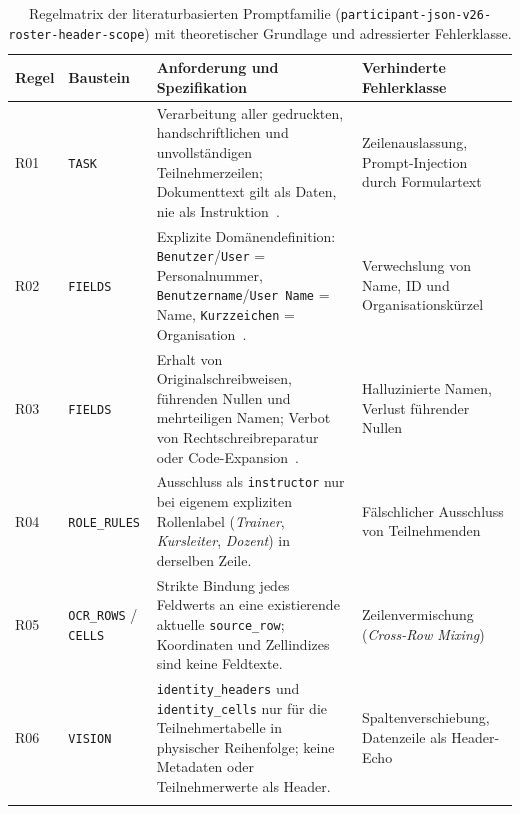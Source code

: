 \begin{table}[htbp]
  \centering
  \caption[Regelmatrix der literaturbasierten Promptfamilie]{Regelmatrix der literaturbasierten Promptfamilie (\texttt{participant-json-v26-roster-header-scope}) mit theoretischer Grundlage und adressierter Fehlerklasse.}
  \label{tab:prompt-regelmatrix}
  \footnotesize
  \begin{tabularx}{\textwidth}{@{}>{\raggedright\arraybackslash}p{} >{\raggedright\arraybackslash}p{} >{\raggedright\arraybackslash}X >{\raggedright\arraybackslash}p{}@{}}
    \toprule
    \textbf{Regel} & \textbf{Baustein} & \textbf{Anforderung und Spezifikation} & \textbf{Verhinderte Fehlerklasse} \\
    \midrule
    R01 & \texttt{TASK} & Verarbeitung aller gedruckten, handschriftlichen und unvollständigen Teilnehmerzeilen; Dokumenttext gilt als Daten, nie als Instruktion~\cite{Wang2023InstructUIE}. & Zeilenauslassung, Prompt-Injection durch Formulartext \\
    \addlinespace[2pt]
    R02 & \texttt{FIELDS} & Explizite Domänendefinition: \texttt{Benutzer}/\texttt{User} = Personalnummer, \texttt{Benutzername}/\texttt{User Name} = Name, \texttt{Kurzzeichen} = Organisation~\cite{Sainz2024GoLLIE}. & Verwechslung von Name, ID und Organisationskürzel \\
    \addlinespace[2pt]
    R03 & \texttt{FIELDS} & Erhalt von Originalschreibweisen, führenden Nullen und mehrteiligen Namen; Verbot von Rechtschreibreparatur oder Code-Expansion~\cite{Huang2024Hallucination}. & Halluzinierte Namen, Verlust führender Nullen \\
    \addlinespace[2pt]
    R04 & \texttt{ROLE\_RULES} & Ausschluss als \texttt{instructor} nur bei eigenem expliziten Rollenlabel (\emph{Trainer}, \emph{Kursleiter}, \emph{Dozent}) in derselben Zeile. & Fälschlicher Ausschluss von Teilnehmenden \\
    \addlinespace[2pt]
    R05 & \texttt{OCR\_ROWS} / \texttt{CELLS} & Strikte Bindung jedes Feldwerts an eine existierende aktuelle \texttt{source\_row}; Koordinaten und Zellindizes sind keine Feldtexte. & Zeilenvermischung (\emph{Cross-Row Mixing}) \\
    \addlinespace[2pt]
    R06 & \texttt{VISION} & \texttt{identity\_headers} und \texttt{identity\_cells} nur für die Teilnehmertabelle in physischer Reihenfolge; keine Metadaten oder Teilnehmerwerte als Header. & Spaltenverschiebung, Datenzeile als Header-Echo \\
    \addlinespace[2pt]

\end{tabularx}
\end{table}

